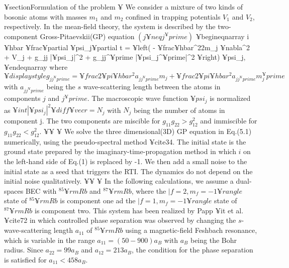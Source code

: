 {{{{{¥section{Formulation of the problem}
¥ We consider a mixture of two kinds of bosonic atoms with
masses $m_1$ and $m_2$ confined in trapping potentials $V_1$ and
$V_2$, respectively. In the mean-field theory, the system is described
by the two-component Gross-Pitaevskii(GP) equation $(j ¥neq j^¥prime)$
¥begin{eqnarray}
i ¥hbar ¥frac{¥partial ¥psi_j}{¥partial t} =
¥left(
- ¥frac{¥hbar^2}{2m_j} ¥nabla^2 + V_j + g_{jj} |¥psi_j|^2 + g_{jj^¥prime} |¥psi_{j^¥prime}|^2
¥right) ¥psi_j,
¥end{eqnarray}
where $¥displaystyle g_{jj^¥prime} = ¥frac{2 ¥pi ¥hbar^2 a_{jj^¥prime}}{m_j}
+¥frac{2 ¥pi ¥hbar^2 a_{jj^¥prime}}{m_j^¥prime}$ with $a_{jj^¥prime}$ being the
$s$ wave-scattering length between the atoms in components $j$ and $j^¥prime$.
The macroscopic wave function $¥psi_j$ is normalized as $¥int |¥psi_j|^2 ¥diff ¥vec{r} = N_j$
with $N_j$ being the number of atoms in component j. The two components are miscible for 
$g_{11}g_{22} > g_{12}^2$ and immiscible for $g_{11}g_{22} < g_{12}^2$.
¥¥
¥ We solve the three dimensional(3D) GP equation in Eq.(5.1)
numerically, using the pseudo-spectral method ¥cite{34}. The initial
state is the ground state prepared by the imaginary-time-propagation method
in which $i$ on the left-hand side of Eq.(1) is replaced by -1. We then add a small noise to
the initial state as a seed that triggers the RTI. The dynamics do not 
depend on the initial noise qualitatively.
¥¥
¥ In the following calculations, we assume a dual-spaces 
BEC with $^{85} {¥rm Rb}$ and $^{87} {¥rm Rb}$, where the $|f=2, m_f = -1 ¥rangle$ state
of $^{85} {¥rm Rb}$ is component one ad the $|f=1, m_f=-1 ¥rangle$ state
of $^{87} {¥rm Rb}$ is component two. This system has been realized
by Papp {¥it et al}.¥cite{72} in which controlled phase separation
was observed by changing the $s$-wave-scattering length $a_{11}$
of $^{85} {¥rm Rb}$ using a magnetic-field Feshbach resonance, which is
variable in the range $a_{11}=(50-900)a_B$ with $a_B$ being the Bohr
radius. Since $a_{22} = 99 a_B$ and $a_{12}=213a_B$, the condition for
the phase separation is satisfied for $a_{11} < 458 a_B$.


}}}}}
